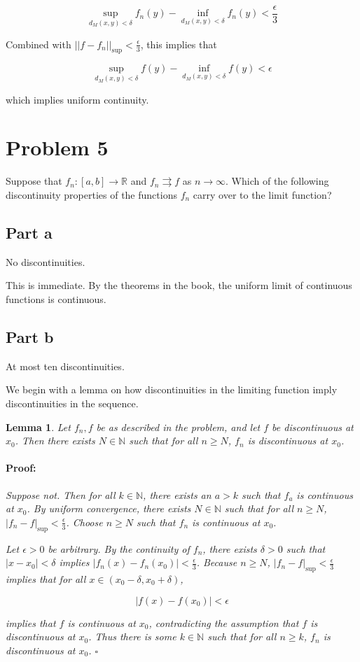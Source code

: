 \documentclass{article}
\newenvironment{proof}{\paragraph{Proof:}}{\hfill$\square$}
\newtheorem{lemma}[theorem]{Lemma}
\newcommand{\R}{\mathbb{R}}
\newcommand{\N}{\mathbb{N}}
\begin{document}
\[
\sup_{d_M(x, y) < \delta} f_n(y) - \inf_{d_M(x, y) < \delta} f_n(y) < \frac{\epsilon}{3}
\]

Combined with $||f - f_n||_{\sup} < \frac{\epsilon}{3}$, this implies that

\[
\sup_{d_M(x, y) < \delta} f(y) - \inf_{d_M(x, y) < \delta} f(y) < \epsilon
\]

which implies uniform continuity.

\section*{Problem 5}

Suppose that $f_n: [a, b] \rightarrow \R$ and $f_n \rightrightarrows f$ as $n \rightarrow \infty$. Which of the following discontinuity properties of the functions $f_n$ carry over to the limit function?

\subsection*{Part a}

No discontinuities.

This is immediate. By the theorems in the book, the uniform limit of continuous functions is continuous.

\subsection*{Part b}

At most ten discontinuities.

We begin with a lemma on how discontinuities in the limiting function imply discontinuities in the sequence.

\begin{lemma}
Let $f_n, f$ be as described in the problem, and let $f$ be discontinuous at $x_0$. Then there exists $N \in \N$ such that for all $n \geq N$, $f_n$ is discontinuous at $x_0$.

\begin{proof}
Suppose not. Then for all $k \in \N$, there exists an $a > k$ such that $f_a$ is continuous at $x_0$.  By uniform convergence, there exists $N \in \N$ such that for all $n \geq N$, $|f_n - f|_{\sup} < \frac{\epsilon}{3}$. Choose $n \geq N$ such that $f_n$ is continuous at $x_0$.

Let $\epsilon > 0$ be arbitrary. By the continuity of $f_n$, there exists $\delta > 0$ such that $|x-x_0| < \delta$ implies $|f_n(x) - f_n(x_0)| < \frac{\epsilon}{3}$. Because $n \geq N$, $|f_n - f|_{\sup} < \frac{\epsilon}{3}$ implies that for all $x \in (x_0-\delta, x_0 + \delta)$,

\[
|f(x) - f(x_0)| < \epsilon
\]

implies that $f$ is continuous at $x_0$, contradicting the assumption that $f$ is discontinuous at $x_0$. Thus there is some $k \in \N$ such that for all $n \geq k$, $f_n$ is discontinuous at $x_0$.
\end{proof}
\end{lemma}
\end{document}
